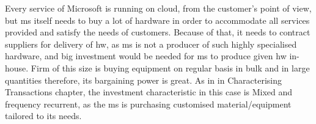 Every service of Microsoft is running on cloud, from the customer’s point of view, but \acrshort{ms} itself needs to buy a lot of hardware in order to accommodate all services provided and satisfy the needs of customers. Because of that, it needs to contract suppliers for delivery of \acrshort{hw}, as \acrshort{ms} is not a producer of such highly specialised hardware\footnotemark, and big investment would be needed for \acrshort{ms} to produce given \acrshort{hw} in-house. Firm of this size is buying equipment on regular basis in bulk and in large quantities therefore, its bargaining power is great. As in \cite{Williamson1979Transaction-CostRelations} in Characterising Transactions chapter, the investment characteristic in this case is Mixed and frequency recurrent, as the \acrshort{ms} is purchasing customised material/equipment tailored to its needs.
% 
